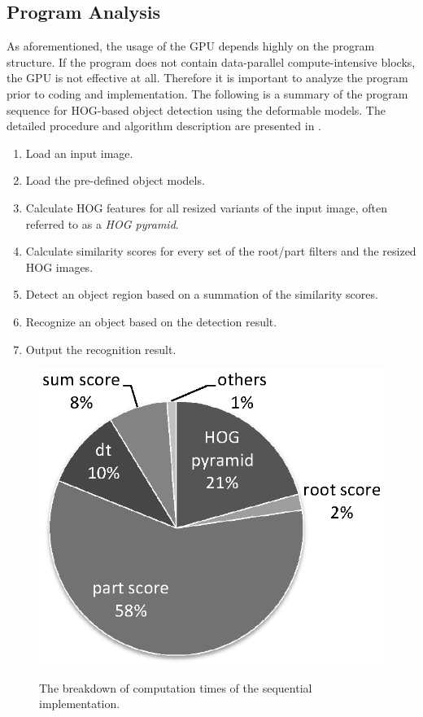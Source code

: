 \subsection{Program Analysis}
\label{sec:analysis}

As aforementioned, the usage of the GPU depends highly on the program
structure.
If the program does not contain data-parallel compute-intensive blocks,
the GPU is not effective at all.
Therefore it is important to analyze the program prior to coding and
implementation.
The following is a summary of the program sequence for HOG-based object
detection using the deformable models.
The detailed procedure and algorithm description are presented in
\cite{Felzenszwalb10, Niknejad12}.

\begin{enumerate}
\item Load an input image.
\item Load the pre-defined object models.
\item Calculate HOG features for all resized variants of the input
      image, often referred to as a \textit{HOG pyramid}.
\item Calculate similarity scores for every set of the root/part filters
      and the resized HOG images.
\item Detect an object region based on a summation of the similarity
      scores.
\item Recognize an object based on the detection result.
\item Output the recognition result.
\end{enumerate}

\begin{figure}[t]
 \begin{center}
  \includegraphics[width=0.65\hsize]{fig/breakdown.eps}\\
  \caption{The breakdown of computation times of the sequential implementation.}
  \label{fig:breakdown}
 \end{center}
\end{figure}

